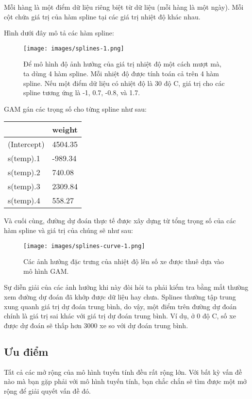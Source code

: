 Mỗi hàng là một điểm dữ liệu riêng biệt từ dữ liệu (mỗi hàng là một ngày). Mỗi cột chứa giá trị của hàm spline tại các giá trị nhiệt độ khác nhau.

\clearpage
Hình dưới đây mô tả các hàm spline:
\begin{figure*}[h!]
	\centering
	\texttt{[image: images/splines-1.png]}
	\label{fig:4_3_14}
	\caption{Để mô hình độ ảnh hưởng của giá trị nhiệt độ một cách mượt mà, ta dùng 4 hàm spline. Mỗi nhiệt độ được tính toán cả trên 4 hàm spline. Nếu một điểm dữ liệu có nhiệt độ là 30 độ C, giá trị cho các spline tương ứng là -1, 0.7, -0.8, và 1.7.}
\end{figure*}

GAM gán các trọng số cho từng spline như sau:

\begin{table*}[hbt!]
\centering
\begin{tabular}{|l|l|}
\hline
            & weight  \\ \hline
(Intercept) & 4504.35 \\ \hline
s(temp).1   & -989.34 \\ \hline
s(temp).2   & 740.08  \\ \hline
s(temp).3   & 2309.84 \\ \hline
s(temp).4   & 558.27  \\ \hline
\end{tabular}
\end{table*}

Và cuối cùng, đường dự đoán thực tế được xây dựng từ tổng trọng số của các hàm spline và giá trị của chúng sẽ như sau:

\begin{figure*}[h!]
	\centering
	\texttt{[image: images/splines-curve-1.png]}
	\label{fig:4_3_15}
	\caption{Các ảnh hưởng đặc trưng của nhiệt độ lên số xe được thuê dựa vào mô hình GAM.}
\end{figure*}

Sự diễn giải của các ảnh hưởng khi này đòi hỏi ta phải kiểm tra bằng mắt thường xem đường dự đoán đã khớp được dữ liệu hay chưa. Splines thường tập trung xung quanh giá trị dự đoán trung bình, do vậy, một điểm trên đường dự đoán chính là giá trị sai khác với giá trị dự đoán trung bình. Ví dụ, ở 0 độ C, số xe được dự đoán sẽ thấp hơn 3000 xe so với dự đoán trung bình.

\subsection{Ưu điểm}
Tất cả các mở rộng của mô hình tuyến tính đều rất rộng lớn. Với bất kỳ vấn đề nào mà bạn gặp phải với mô hình tuyến tính, bạn chắc chắn sẽ tìm được một mở rộng để giải quyết vấn đề đó.

